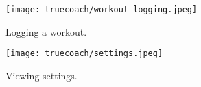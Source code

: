 \begin{figure}[H]
    \centering
    \begin{minipage}{0.4\textwidth}
        \centering
        \texttt{[image: truecoach/workout-logging.jpeg]}
        \caption{Logging a workout.}
        \label{fig:tc-workout}
    \end{minipage}\qquad
    \begin{minipage}{0.4\textwidth}
        \centering
        \texttt{[image: truecoach/settings.jpeg]}
        \caption{Viewing settings.}
        \label{fig:tc-settings}
    \end{minipage}%
\end{figure}